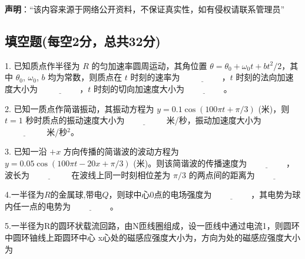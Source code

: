 
\textbf{声明}：“该内容来源于网络公开资料，不保证真实性，如有侵权请联系管理员”

\subsection{填空题(每空2分，总共32分)}

1. 已知质点作半径为 \( R \) 的匀加速率圆周运动，其角位置 \( \theta = \theta_0 + \omega_0 t + bt^2/2 \)，其中 \( \theta_0 \), \( \omega_0 \), \( b \) 均为常数，则质点在 \( t \) 时刻的速率为 $\underline{\hspace{2cm}}$，\( t \) 时刻的法向加速度大小为 $\underline{\hspace{2cm}}$，\( t \) 时刻的切向加速度大小为$\underline{\hspace{2cm}}$。

2. 已知一质点作简谐振动，其振动方程为 \( y = 0.1 \cos (100\pi t + \pi/3) \) (米)，则 \( t = 1 \) 秒时质点的振动速度大小为$\underline{\hspace{2cm}}$ 米/秒，振动加速度大小为 $\underline{\hspace{2cm}}$ 米/秒\(^2\)。

3. 已知一沿 $ +x $ 方向传播的简谐波的波动方程为$y = 0.05 \cos (100\pi t - 20x + \pi/3)$ (米)。则该简谐波的传播速度为$\underline{\hspace{2cm}}$，波长为$\underline{\hspace{2cm}}$ 在波线上同一时刻相位差为 $\pi/3$ 的两点间的距离为$\underline{\hspace{2cm}}$

4.一半径为$R$的金属球,带电$Q$，则球中心0点的电场强度为$\underline{\hspace{2cm}}$，其电势为球内任一点的电势为$\underline{\hspace{2cm}}$。

5.一半径为R的圆环状载流回路，由N匝线圈组成，设一匝线中通过电流1，则圆环中圆环铀线上距圆环中心 x心处的磁感应强度大小为，方向为处的磁感应强度大小为